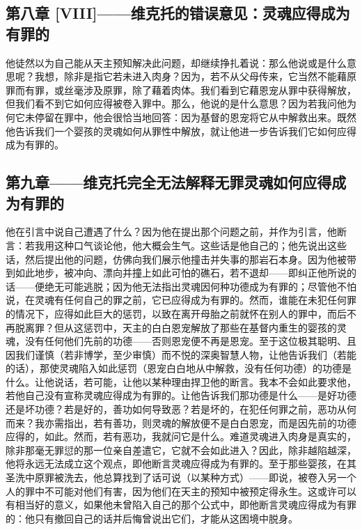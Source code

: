 
\subsection{第八章 [VIII]——维克托的错误意见：灵魂应得成为有罪的}

他徒然以为自己能从天主预知解决此问题，却继续挣扎着说：那么他说或是什么意思呢？我想，除非是指它若未进入肉身？因为，若不从父母传来，它当然不能藉原罪而有罪，或丝毫涉及原罪，除了藉着肉体。我们看到它藉恩宠从罪中获得解放，但我们看不到它如何应得被卷入罪中。那么，他说的是什么意思？因为若我问他为何它未停留在罪中，他会很恰当地回答：因为基督的恩宠将它从中解救出来。既然他告诉我们一个婴孩的灵魂如何从罪性中解放，就让他进一步告诉我们它如何应得成为有罪的。\par


\subsection{第九章——维克托完全无法解释无罪灵魂如何应得成为有罪的}

他在引言中说自己遭遇了什么？因为他在提出那个问题之前，并作为引言，他断言：若我用这种口气谈论他，他大概会生气。这些话是他自己的；他先说出这些话，然后提出他的问题，仿佛向我们展示他撞击并失事的那岩石本身。因为他被带到如此地步，被冲向、漂向并撞上如此可怕的礁石，若不退却——即纠正他所说的话——便绝无可能逃脱；因为他无法指出灵魂因何种功德成为有罪的；尽管他不怕说，在灵魂有任何自己的罪之前，它已应得成为有罪的。然而，谁能在未犯任何罪的情况下，应得如此巨大的惩罚，以致在离开母胎之前就怀在别人的罪中，而后不再脱离罪？但从这惩罚中，天主的白白恩宠解放了那些在基督内重生的婴孩的灵魂，没有任何他们先前的功德——否则恩宠便不再是恩宠。至于这位极其聪明、且因我们谨慎（若非博学，至少审慎）而不悦的深奥智慧人物，让他告诉我们（若能的话），那使灵魂陷入如此惩罚（恩宠白白地从中解救，没有任何功德）的功德是什么。让他说话，若可能，让他以某种理由捍卫他的断言。我本不会如此要求他，若他自己没有宣称灵魂应得成为有罪的。让他告诉我们那功德是什么——是好功德还是坏功德？若是好的，善功如何导致恶？若是坏的，在犯任何罪之前，恶功从何而来？我亦需指出，若有善功，则灵魂的解放便不是白白恩宠，而是因先前的功德应得的，如此。然而，若有恶功，我就问它是什么。难道灵魂进入肉身是真实的，除非那毫无罪愆的那一位亲自差遣它，它就不会如此进入？因此，除非越陷越深，他将永远无法成立这个观点，即他断言灵魂应得成为有罪的。至于那些婴孩，在其圣洗中原罪被洗去，他总算找到了话可说（以某种方式）——即说，被卷入另一个人的罪中不可能对他们有害，因为他们在天主的预知中被预定得永生。这或许可以有相当好的意义，如果他未曾陷入自己的那个公式中，即他断言灵魂应得成为有罪的：他只有撤回自己的话并后悔曾说出它们，才能从这困境中脱身。\par

